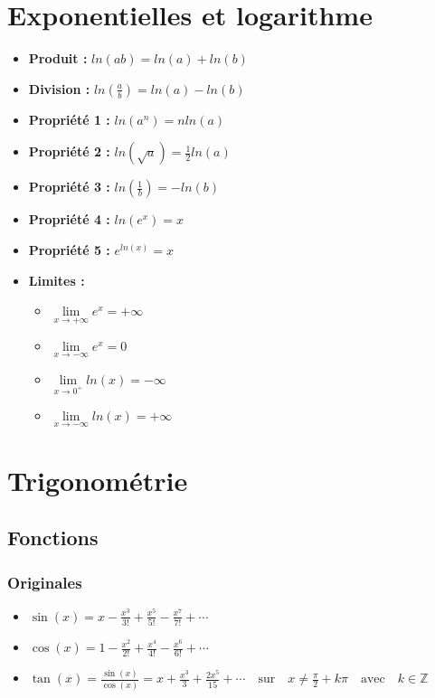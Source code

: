 \documentclass[12]{article}%
\theoremstyle{plain}
\theoremstyle{definition}
\theoremstyle{remark}
\begin{document}
\section{Exponentielles et logarithme}
\large
\begin{itemize}
	\item \textbf{Produit :} \( \boxed{ln(ab) = ln(a) + ln(b)} \)
	\item \textbf{Division :} \( \boxed{ln\left (\frac{a}{b}\right ) = ln(a) - ln(b)} \)
	\item \textbf{Propriété 1 :} \( \boxed{ln(a^{n}) = nln(a)} \)
	\item \textbf{Propriété 2 :} \( \boxed{ln\left (\sqrt{a}\right ) = \frac{1}{2}ln(a)} \)
	\item \textbf{Propriété 3 :} \( \boxed{ln\left (\frac{1}{b}\right ) = -ln(b)} \)
	\item \textbf{Propriété 4 :} \( \boxed{ln(e^{x}) = x} \)
	\item \textbf{Propriété 5 :} \( \boxed{e^{ln(x)} = x} \)
	\item \textbf{Limites :}
	\begin{itemize}
		\item \( \boxed{\lim\limits_{x \to +\infty} e^{x} = +\infty} \)
		\item \( \boxed{\lim\limits_{x \to -\infty} e^{x} = 0} \)
		
		\item \( \boxed{\lim\limits_{x \to 0^{+}} ln(x) = -\infty} \)
		\item \( \boxed{\lim\limits_{x \to -\infty} ln(x) = +\infty} \)
	\end{itemize}
\end{itemize}

\newpage
\section{Trigonométrie}
\large
\subsection{Fonctions}
\subsubsection{Originales}
\begin{itemize}
	\item \( \boxed{\sin(x) = x - \frac{x^3}{3!} + \frac{x^5}{5!} - \frac{x^7}{7!} + \cdots} \)
	\item \( \boxed{\cos(x) = 1 - \frac{x^2}{2!} + \frac{x^4}{4!} - \frac{x^6}{6!} + \cdots} \)
	\item \( \boxed{\tan(x) = \frac{\sin(x)}{\cos(x)} = x + \frac{x^3}{3} + \frac{2x^5}{15} + \cdots} \quad \text{sur} \quad x \neq \frac{\pi}{2} + k\pi \quad \text{avec} \quad k \in \mathbb{Z} \)
\end{itemize}
\end{document}
